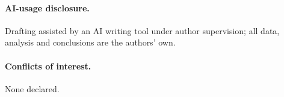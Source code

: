 \documentclass[10pt,a4paper,twocolumn]{article}
\begin{document}
\paragraph{AI-usage disclosure.} Drafting assisted by an AI writing tool under
author supervision; all data, analysis and conclusions are the authors' own.

\paragraph{Conflicts of interest.} None declared.



\end{document}
